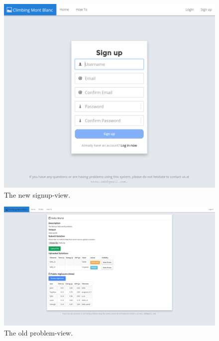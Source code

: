 \begin{figure}[h!]
    \centering
    \includegraphics[width=1.0\textwidth]{screenshots/signup.png}
    \caption[]{The new signup-view.}
    \label{fig:apdx-old-signup}
\end{figure}

\begin{figure}[h!]
    \centering
    \includegraphics[width=1.0\textwidth]{oldscreenshots/problem.png}
    \caption[]{The old problem-view.}
    \label{fig:apdx-old-problem}
\end{figure}

